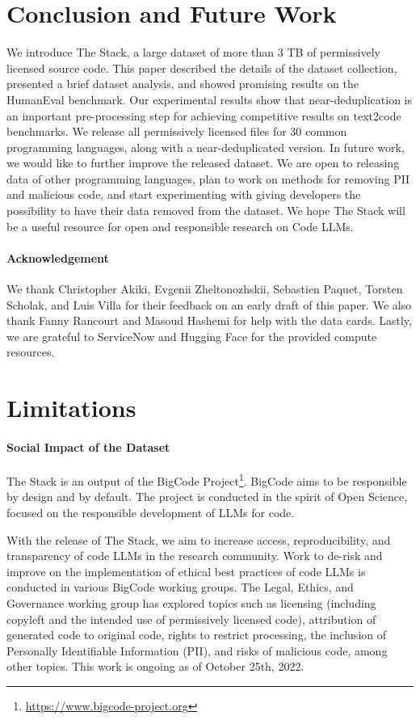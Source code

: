 \section{Conclusion and Future Work} We introduce The Stack, a large dataset of more than 3 TB of permissively licensed source code. This paper described the details of the dataset collection, presented a brief dataset analysis, and showed promising results on the HumanEval benchmark. Our experimental results show that near-deduplication is an important pre-processing step for achieving competitive results on text2code benchmarks. We release all permissively licensed files for 30 common programming languages, along with a near-deduplicated version. In future work, we would like to further improve the released dataset. We are open to releasing data of other programming languages, plan to work on methods for removing PII and malicious code, and start experimenting with giving developers the possibility to have their data removed from the dataset. We hope The Stack will be a useful resource for open and responsible research on Code LLMs. 

\paragraph{Acknowledgement} 
We thank Christopher Akiki, Evgenii Zheltonozhskii, Sebastien Paquet, Torsten Scholak, and Luis Villa for their feedback on an early draft of this paper. We also thank Fanny Rancourt and Masoud Hashemi for help with the data cards. Lastly, we are grateful to ServiceNow and Hugging Face for the provided compute resources. 

\section{Limitations}

\paragraph{Social Impact of the Dataset} The Stack is an output of the BigCode Project\footnote{\url{https://www.bigcode-project.org}}. BigCode aims to be responsible by design and by default. The project is conducted in the spirit of Open Science, focused on the responsible development of LLMs for code.

With the release of The Stack, we aim to increase access, reproducibility, and transparency of code LLMs in the research community. Work to de-risk and improve on the implementation of ethical best practices of code LLMs is conducted in various BigCode working groups. The Legal, Ethics, and Governance working group has explored topics such as licensing (including copyleft and the intended use of permissively licensed code), attribution of generated code to original code, rights to restrict processing, the inclusion of Personally Identifiable Information (PII), and risks of malicious code, among other topics. This work is ongoing as of October 25th, 2022.

